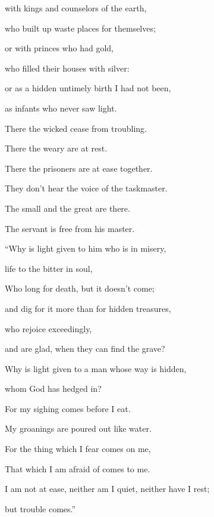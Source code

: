 {\par }{\Q {}with kings and counselors of the earth,
\par }{\QB who built up waste places for themselves;
\par }{\Q {}or with princes who had gold,
\par }{\QB who filled their houses with silver:
\par }{\Q {}or as a hidden untimely birth I had not been,
\par }{\QB as infants who never saw light.
\par }{\Q {}There the wicked cease from troubling.
\par }{\QB There the weary are at rest.
\par }{\Q {}There the prisoners are at ease together.
\par }{\QB They don’t hear the voice of the taskmaster.
\par }{\Q {}The small and the great are there.
\par }{\QB The servant is free from his master.
\par }{\BB \par }{\Q {}“Why is light given to him who is in misery,
\par }{\QB life to the bitter in soul,
\par }{\Q {}Who long for death, but it doesn’t come;
\par }{\QB and dig for it more than for hidden treasures,
\par }{\Q {}who rejoice exceedingly,
\par }{\QB and are glad, when they can find the grave?
\par }{\Q {}Why is light given to a man whose way is hidden,
\par }{\QB whom God has hedged in?
\par }{\Q {}For my sighing comes before I eat.
\par }{\QB My groanings are poured out like water.
\par }{\Q {}For the thing which I fear comes on me,
\par }{\QB That which I am afraid of comes to me.
\par }{\Q {}I am not at ease, neither am I quiet, neither have I rest;
\par }{\QB but trouble comes.”

}
